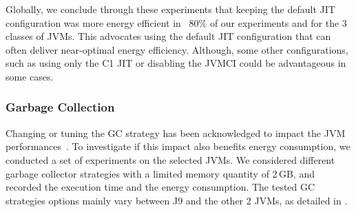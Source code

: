 Globally, we conclude through these experiments that keeping the default JIT configuration was more energy efficient in ~80\% of our experiments and for the 3 classes of JVMs.
This advocates using the default JIT configuration that can often deliver near-optimal energy efficiency.
Although, some other configurations, such as using only the C1 JIT or disabling the JVMCI could be advantageous in some cases.


\subsubsection{Garbage Collection}
Changing or tuning the GC strategy has been acknowledged to impact the JVM performances~\cite{10.1145/2568088.2568097}.
To investigate if this impact also benefits energy consumption, we conducted a set of experiments on the selected JVMs.
We considered different garbage collector strategies with a limited memory quantity of 2\,GB, and recorded the execution time and the energy consumption.
The tested GC strategies options mainly vary between \textsc{J9} and the other 2 JVMs, as detailed in .

